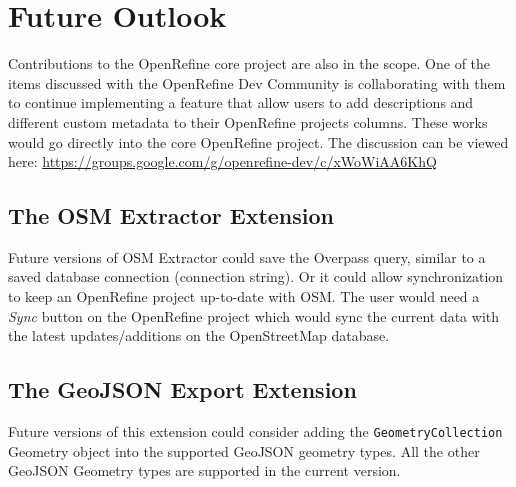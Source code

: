 \section*{Future Outlook}
Contributions to the OpenRefine core project are also in the scope. One of the items discussed with the OpenRefine Dev Community is collaborating with them to continue implementing a feature that allow users to add descriptions and different custom metadata to their OpenRefine project\textquotesingle s columns. These works would go directly into the core OpenRefine project. The discussion can be viewed here: \href{https://groups.google.com/g/openrefine-dev/c/xWoWiAA6KhQ}{https://groups.google.com/g/openrefine-dev/c/xWoWiAA6KhQ}
\subsection*{The OSM Extractor Extension}
Future versions of OSM Extractor could save the
Overpass query, similar to a saved database connection (connection string). Or it
could allow synchronization to keep an OpenRefine
project up-to-date with OSM. The user would need a \textit{Sync} button on the OpenRefine project which would sync the current data with the latest updates/additions on the OpenStreetMap database.
\subsection*{The GeoJSON Export Extension}
Future versions of this extension could consider adding the  \texttt{GeometryCollection} Geometry object
into the supported GeoJSON geometry types. All the other GeoJSON Geometry types are supported in the current version.
